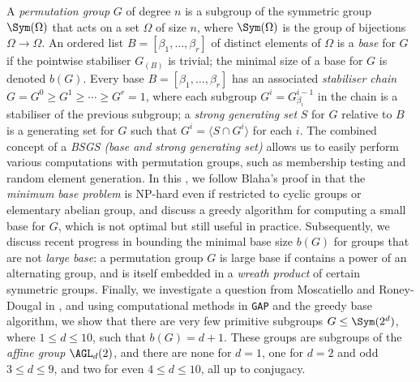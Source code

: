 A \textit{permutation group} $G$ of degree $n$ is a subgroup of the symmetric group $\Sym(\Omega)$ that acts on a set $\Omega$ of size $n$, where $\Sym(\Omega)$ is the group of bijections $\Omega \to \Omega$. An ordered list $B = [\beta_1,\dotsc,\beta_r]$ of distinct elements of $\Omega$ is a \textit{base} for $G$ if the pointwise stabiliser $G_{(B)}$ is trivial; the minimal size of a base for $G$ is denoted $b(G)$. Every base $B = [\beta_1,\dotsc,\beta_r]$ has an associated \textit{stabiliser chain} $G = G^0 \geq G^1 \geq \dotsb \geq G^r = 1$, where each subgroup $G^i = G^{i-1}_{\beta_i}$ in the chain is a stabiliser of the previous subgroup; a \textit{strong generating set} $S$ for $G$ relative to $B$ is a generating set for $G$ such that $G^i = \langle S \cap G^i \rangle$ for each $i$. The combined concept of a \textit{BSGS (base and strong generating set)} allows us to easily perform various computations with permutation groups, such as membership testing and random element generation. In this \thesis{}, we follow Blaha's proof in \cite{blaha1992} that the \textit{minimum base problem} is NP-hard even if restricted to cyclic groups or elementary abelian group, and discuss a greedy algorithm for computing a small base for $G$, which is not optimal but still useful in practice. Subsequently, we discuss recent progress in bounding the minimal base size $b(G)$ for groups that are not \textit{large base}: a permutation group $G$ is large base if contains a power of an alternating group, and is itself embedded in a \textit{wreath product} of certain symmetric groups. Finally, we investigate a question from Moscatiello and Roney-Dougal in \cite{moscatiello_roney-dougal2021}, and using computational methods in \texttt{GAP} and the greedy base algorithm, we show that there are very few primitive subgroups $G \leq \Sym(2^d)$, where $1 \leq d \leq 10$, such that $b(G) = d + 1$. These groups are subgroups of the \textit{affine group} $\AGL_d(2)$, and there are none for $d = 1$, one for $d = 2$ and odd $3 \leq d \leq 9$, and two for even $4 \leq d \leq 10$, all up to conjugacy.